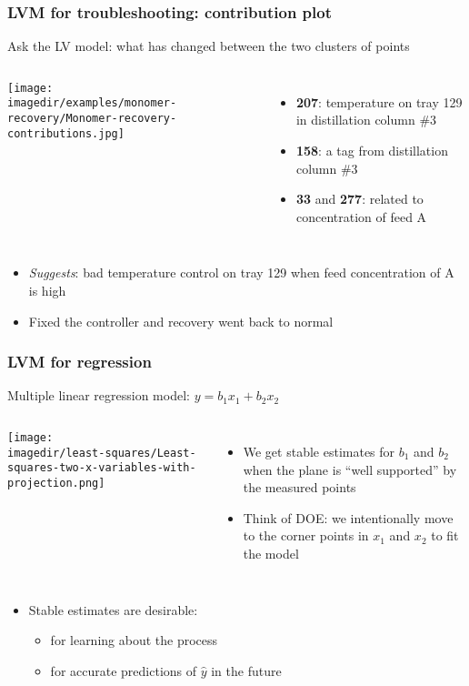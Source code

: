\begin{frame}\frametitle{LVM for troubleshooting: contribution plot}

	Ask the LV model: what has changed between the two clusters of points
	\begin{columns}[c]
			\begin{center}
				\texttt{[image: \\imagedir/examples/monomer-recovery/Monomer-recovery-contributions.jpg]} 
			\end{center}
			\vfill
			\begin{itemize}
				\item	\textbf{207}: temperature on tray 129 in distillation column \#3
				\item	\textbf{158}: a tag from distillation column \#3
				\item	\textbf{33} and \textbf{277}: related to concentration of feed A
			\end{itemize}
	\end{columns}
	\begin{itemize}
		\item	\emph{Suggests}: bad temperature control on tray 129 when feed concentration of A is high
		\item	Fixed the controller and recovery went back to normal
	\end{itemize}
\end{frame}

\begin{frame}\frametitle{LVM for regression}

	Multiple linear regression model: $y = b_1x_1 + b_2x_2$
	\begin{columns}
		\column{6cm}
		\texttt{[image: \\imagedir/least-squares/Least-squares-two-x-variables-with-projection.png]} \column{4cm}
		\begin{itemize}
			\item	We get stable estimates for $b_1$ and $b_2$ when the plane is ``well supported'' by the measured points
			\item	Think of DOE: we intentionally move to the corner points in $x_1$ and $x_2$ to fit the model
		\end{itemize}
	\end{columns}
	\begin{itemize}
		\item	Stable estimates are desirable:
		\begin{itemize}
			\item	for learning about the process
			\item	for accurate predictions of $\hat{y}$ in the future
		\end{itemize}
	\end{itemize}
\end{frame}

